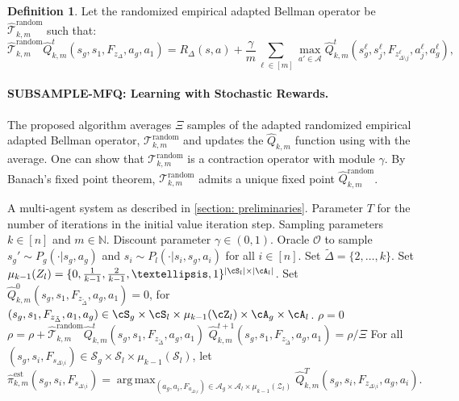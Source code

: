 \documentclass{article}
\theoremstyle{plain}
\theoremstyle{definition}
\newtheorem{definition}[theorem]{Definition}
\def\est{\mathrm{est}}
\def\N{\mathbb{N}}
\DeclareMathOperator*{\argmax}{arg\,max}
\begin{document}
\begin{definition} Let the randomized empirical adapted Bellman operator be $\hat{\mathcal{T}}^{\text{random}}_{k,m}$ such that:
    \begin{equation}\hat{\mathcal{T}}^{\text{random}}_{k,m} \hat{Q}^t_{k,m}(s_g,s_1, F_{z_\Delta}, a_g,a_1) = R_\Delta(s,a) + \frac{\gamma}{m} \sum_{\ell \in [m]}\max_{a'\in\mathcal{A}} \hat{Q}_{k,m}^t(s_g^\ell,s_j^\ell, F_{z_{\Delta\setminus j}^\ell},a_j^\ell,a_g^\ell),\end{equation}

\end{definition}
\paragraph{SUBSAMPLE-MFQ: Learning with Stochastic Rewards.} The proposed algorithm averages $\Xi$ samples of the adapted randomized empirical adapted Bellman operator, $\mathcal{T}_{k,m}^{\text{random}}$ and updates the $\hat{Q}_{k,m}$ function using with the average. One can show that $\mathcal{T}_{k,m}^{\text{random}}$ is a contraction operator with module $\gamma$. By Banach's fixed point theorem, $\mathcal{T}_{k,m}^{\text{random}}$ admits a unique fixed point $\hat{Q}_{k,m}^{\text{random}}$.


\begin{algorithm}[H]
\caption{\texttt{SUBSAMPLE-MFQ}: Learning with Stochastic Rewards}\label{algorithm: approx-dense-tolerable-Q-learning_random_rewards}
\begin{algorithmic}[1]
\REQUIRE A multi-agent system as described in \cref{section: preliminaries}.
Parameter $T$ for the number of iterations in the initial value iteration step. Sampling parameters $k \in [n]$ and $m\in \N$. Discount parameter $\gamma\in (0,1)$. Oracle $\mathcal{O}$ to sample $s_g'\sim {P}_g(\cdot|s_g,a_g)$ and $s_i\sim {P}_l(\cdot|s_i,s_g,a_i)$ for all $i\in[n]$.
\STATE Set $\tilde{\Delta} = \{2,\dots,k\}$. 
\STATE Set $\mu_{k-1}(Z_l) = \{0,\frac{1}{k-1},\frac{2}{k-1},\dots,1\}^{|\cS_l|\times|\cA_l|}$.
\STATE Set $\hat{Q}^0_{k,m}(s_g,s_1, F_{z_{\tilde{\Delta}}}, a_g,a_1)=0$, for $(s_g,s_1,F_{z_{\tilde{\Delta}}},a_1,a_g)\in\cS_g\times\cS_l\times\mu_{k-1}(\cZ_l)\times\cA_g\times\cA_l$.
\STATE $\rho=0$
\STATE $\rho = \rho + \hat{\mathcal{T}}^{\text{random}}_{k,m} \hat{Q}^t_{k,m}(s_g,s_1, F_{z_{\tilde{\Delta}}}, a_g,a_1)$
\ENDFOR
\STATE $\hat{Q}^{t+1}_{k,m}(s_g,s_1, F_{z_{\tilde{\Delta}}}, a_g,a_1) = \rho/\Xi$
\ENDFOR
\ENDFOR
\STATE For all $(s_g,s_i,F_{s_{\Delta\setminus i}}) \in \mathcal{S}_g\times \mathcal{S}_l\times\mu_{k-1}{(\mathcal{S}_l)}$, let \[\hat{\pi}_{k,m}^\est(s_g,s_i, F_{s_{\Delta\setminus i}}) = \mathop{\argmax}_{(a_g,a_i,F_{a_{\Delta\setminus i}})\in\mathcal{A}_g\times\mathcal{A}_l\times\mu_{k-1}{(\mathcal{Z}_l)}}\hat{Q}_{k,m}^T(s_g,s_i, F_{z_{\Delta\setminus i}}, a_g,a_i).\]
\end{algorithmic}
\end{algorithm} 
\end{document}
